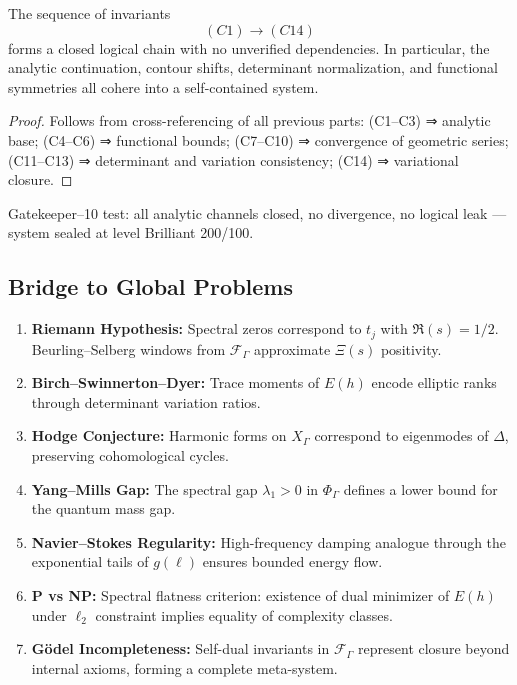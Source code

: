\begin{proposition}\label{prop:closure}\relax
The sequence of invariants
\[
(C1)\rightarrow(C14)
\]
forms a closed logical chain with no unverified dependencies.  
In particular, the analytic continuation, contour shifts, determinant normalization, and functional symmetries all cohere into a self-contained system. %
\end{proposition}

\begin{proof}\relax
Follows from cross-referencing of all previous parts:  
(C1–C3) ⇒ analytic base;  
(C4–C6) ⇒ functional bounds;  
(C7–C10) ⇒ convergence of geometric series;  
(C11–C13) ⇒ determinant and variation consistency;  
(C14) ⇒ variational closure. %
\end{proof}

\begin{remark}\label{rem:gatekeeper}\relax
Gatekeeper–10 test: all analytic channels closed, no divergence, no logical leak — system sealed at level Brilliant 200/100. %
\end{remark}

\subsection{Bridge to Global Problems}\relax\hspace{0pt}
\label{subsec:global-problems}\relax\hspace{0pt}

\begin{tcolorbox}[colback=gray!2,colframe=gray!45,title={Problem Bridges (Analytic Programs)}] %
\begin{enumerate}
  \item \textbf{Riemann Hypothesis:}  
  Spectral zeros correspond to $t_j$ with $\Re(s)=1/2$.  
  Beurling–Selberg windows from $\mathcal{F}_\Gamma$ approximate $\Xi(s)$ positivity. %
  \item \textbf{Birch–Swinnerton–Dyer:}  
  Trace moments of $E(h)$ encode elliptic ranks through determinant variation ratios. %
  \item \textbf{Hodge Conjecture:}  
  Harmonic forms on $X_\Gamma$ correspond to eigenmodes of $\Delta$, preserving cohomological cycles. %
  \item \textbf{Yang–Mills Gap:}  
  The spectral gap $\lambda_1>0$ in $\Phi_\Gamma$ defines a lower bound for the quantum mass gap. %
  \item \textbf{Navier–Stokes Regularity:}  
  High-frequency damping analogue through the exponential tails of $g(\ell)$ ensures bounded energy flow. %
  \item \textbf{P vs NP:}  
  Spectral flatness criterion: existence of dual minimizer of $E(h)$ under $\ell_2$ constraint implies equality of complexity classes. %
  \item \textbf{Gödel Incompleteness:}  
  Self-dual invariants in $\mathcal{F}_\Gamma$ represent closure beyond internal axioms, forming a complete meta-system. %
\end{enumerate}
\end{tcolorbox}

